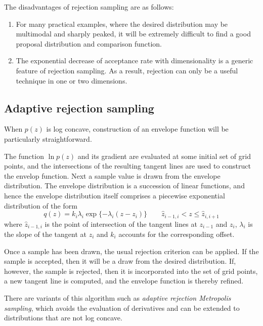 \documentclass[a4paper]{report}
\newcommand{\imp}[1]{{\color{blue}\textit{#1}}}
\begin{document}
The disadvantages of rejection sampling are as follows:
\begin{enumerate}
	\item For many practical examples, where the desired distribution may be multimodal and sharply peaked, it will be extremely difficult to find a good proposal distribution and comparison function.
	\item The exponential decrease of acceptance rate with dimensionality is a generic feature of rejection sampling. As a result, rejection can only be a useful technique in one or two dimensions.
\end{enumerate}
\subsection{Adaptive rejection sampling}
When $p(z)$ is log concave, construction of an envelope function will be particularly straightforward.

The function $\ln p(z)$ and its gradient are evaluated at some initial set of grid points, and the intersections of the resulting tangent lines are used to construct the envelop function. Next a sample value is drawn from the envelope distribution. The envelope distribution is a succession of linear functions, and hence the envelope distribution itself comprises a piecewise exponential distribution of the form
\begin{equation}
	q(z) = k_i \lambda_i \exp \{ -\lambda_i (z - z_i) \} \qquad \hat{z}_{i-1,i} < z \leq \hat{z}_{i,i+1}
\end{equation}
where $\hat{z}_{i-1,i}$ is the point of intersection of the tangent lines at $z_{i-1}$ and $z_i$, $\lambda_i$ is the slope of the tangent at $z_i$ and $k_i$ accounts for the corresponding offset.

Once a sample has been drawn, the usual rejection criterion can be applied. If the sample is accepted, then it will be a draw from the desired distribution. If, however, the sample is rejected, then it is incorporated into the set of grid points, a new tangent line is computed, and the envelope function is thereby refined.

There are variants of this algorithm such as \imp{adaptive rejection Metropolis sampling}, which avoids the evaluation of derivatives and can be extended to distributions that are not log concave.
\end{document}
